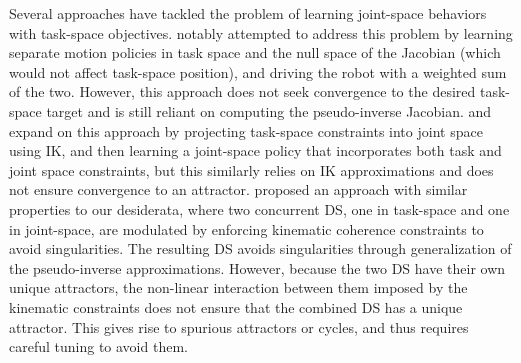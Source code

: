 \documentclass[letterpaper, 10 pt, journal, twoside, fleqn]{IEEEtran}
\begin{document}
Several approaches have tackled the problem of learning joint-space behaviors with task-space objectives. \cite{calinon2008probabilistic} notably attempted to address this problem by learning separate motion policies in task space and the null space of the Jacobian (which would not affect task-space position), and driving the robot with a weighted sum of the two.  However, this approach does not seek convergence to the desired task-space target and is still reliant on computing the pseudo-inverse Jacobian. \cite{calinon2010learning} and \cite{silverio2017learning} expand on this approach by projecting task-space constraints into joint space using IK, and then learning a joint-space policy that incorporates both task and joint space constraints, but this similarly relies on IK approximations and does not ensure convergence to an attractor.
\cite{hersch2008reaching} proposed an approach with similar properties to our desiderata, where two concurrent DS, one in task-space and one in joint-space, are modulated by enforcing kinematic coherence constraints to avoid singularities. The resulting DS avoids singularities through generalization of the pseudo-inverse approximations. However, because the two DS have their own unique attractors, the non-linear interaction between them imposed by the kinematic constraints does not ensure that the combined DS has a unique attractor. This gives rise to spurious attractors or cycles, and thus requires careful tuning to avoid them. 
\end{document}
